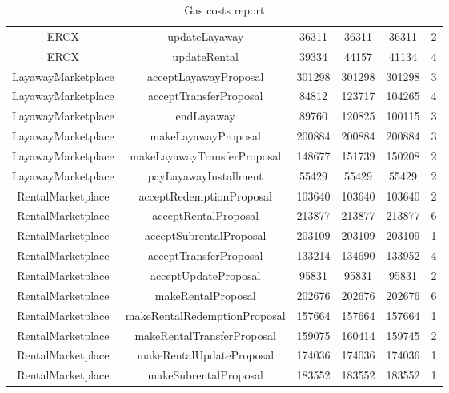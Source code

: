 \documentclass[english, LaM, oneside]{sapthesis}%
\begin{document}
\begin{table}
\begin{adjustbox}{width=0.75\textwidth}
\begin{tabular}{@{}cccccc@{}}
ERCX               & updateLayaway                & 36311        & 36311        & 36311        & 2                \\
ERCX               & updateRental                 & 39334        & 44157        & 41134        & 4                \\
LayawayMarketplace & acceptLayawayProposal        & 301298       & 301298       & 301298       & 3                \\
LayawayMarketplace & acceptTransferProposal       & 84812        & 123717       & 104265       & 4                \\
LayawayMarketplace & endLayaway                   & 89760        & 120825       & 100115       & 3                \\
LayawayMarketplace & makeLayawayProposal          & 200884       & 200884       & 200884       & 3                \\
LayawayMarketplace & makeLayawayTransferProposal  & 148677       & 151739       & 150208       & 2                \\
LayawayMarketplace & payLayawayInstallment        & 55429        & 55429        & 55429        & 2                \\
RentalMarketplace  & acceptRedemptionProposal     & 103640       & 103640       & 103640       & 2                \\
RentalMarketplace  & acceptRentalProposal         & 213877       & 213877       & 213877       & 6                \\
RentalMarketplace  & acceptSubrentalProposal      & 203109       & 203109       & 203109       & 1                \\
RentalMarketplace  & acceptTransferProposal       & 133214       & 134690       & 133952       & 4                \\
RentalMarketplace  & acceptUpdateProposal         & 95831        & 95831        & 95831        & 2                \\
RentalMarketplace  & makeRentalProposal           & 202676       & 202676       & 202676       & 6                \\
RentalMarketplace  & makeRentalRedemptionProposal & 157664       & 157664       & 157664       & 1                \\
RentalMarketplace  & makeRentalTransferProposal   & 159075       & 160414       & 159745       & 2                \\
RentalMarketplace  & makeRentalUpdateProposal     & 174036       & 174036       & 174036       & 1                \\
RentalMarketplace  & makeSubrentalProposal        & 183552       & 183552       & 183552       & 1                \\ \bottomrule
\end{tabular}
\end{adjustbox}
\caption{Gas costs report}
\label{tab:Gas report}
\end{table}
\end{document}
